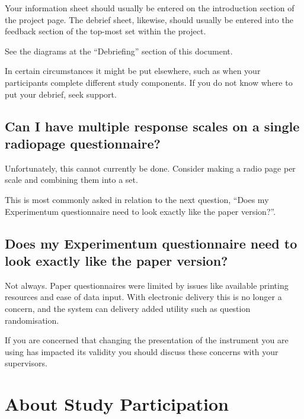 \documentclass[]{book}
\begin{document}
Your information sheet should usually be entered on the introduction
section of the project page. The debrief sheet, likewise, should usually
be entered into the feedback section of the top-most set within the
project.

See the diagrams at the ``Debriefing'' section of this document.

In certain circumstances it might be put elsewhere, such as when your
participants complete different study components. If you do not know
where to put your debrief, seek support.

\subsection*{Can I have multiple response scales on a single radiopage
questionnaire?}\label{can-i-have-multiple-response-scales-on-a-single-radiopage-questionnaire}

Unfortunately, this cannot currently be done. Consider making a radio
page per scale and combining them into a set.

This is most commonly asked in relation to the next question, ``Does my
Experimentum questionnaire need to look exactly like the paper
version?''.

\subsection*{Does my Experimentum questionnaire need to look exactly
like the paper
version?}\label{does-my-experimentum-questionnaire-need-to-look-exactly-like-the-paper-version}

Not always. Paper questionnaires were limited by issues like available
printing resources and ease of data input. With electronic delivery this
is no longer a concern, and the system can delivery added utility such
as question randomisation.

If you are concerned that changing the presentation of the instrument
you are using has impacted its validity you should discuss these
concerns with your supervisors.

\section*{About Study Participation}\label{about-study-participation}
\end{document}
